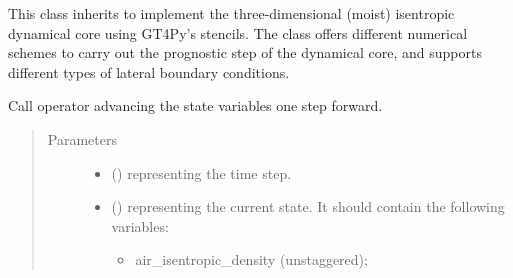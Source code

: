 \documentclass[letterpaper,10pt,english]{sphinxmanual}
\begin{document}
\begin{fulllineitems}
\label{\detokenize{api:dycore.dycore_isentropic.DynamicalCoreIsentropic}}
This class inherits {\hyperref[\detokenize{api:dycore.dycore.DynamicalCore}]{}} to implement the three-dimensional
(moist) isentropic dynamical core using GT4Py’s stencils. The class offers different numerical
schemes to carry out the prognostic step of the dynamical core, and supports different types of
lateral boundary conditions.

\begin{fulllineitems}
\label{\detokenize{api:dycore.dycore_isentropic.DynamicalCoreIsentropic.__call__}}
Call operator advancing the state variables one step forward.
\begin{quote}\begin{description}
\item[{Parameters}] \leavevmode\begin{itemize}
\item {} 
 () \textendash{}  representing the time step.

\item {} 
 () \textendash{} 
{\hyperref[\detokenize{api:storages.state_isentropic.StateIsentropic}]{}} representing the current state.
It should contain the following variables:
\begin{itemize}
\item {} 
air\_isentropic\_density (unstaggered);


\end{itemize}
\end{itemize}
\end{description}
\end{quote}
\end{fulllineitems}
\end{fulllineitems}
\end{document}
